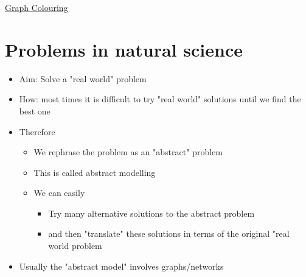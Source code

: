 \documentclass{article}[18pt]
\begin{document}
\begin{center}
\underline{\huge Graph Colouring}
\end{center}
\section{Problems in natural science}
\begin{itemize}
\item Aim: Solve a "real world" problem
\item How: most times it is difficult to try "real world" solutions until we find the best one
\item Therefore
\begin{itemize}
\item We rephrase the problem as an "abstract" problem
\item This is called abstract modelling
\item We can easily
\begin{itemize}
\item Try many alternative solutions to the abstract problem
\item and then "translate" these solutions in terms of the original "real world problem
\end{itemize}
\end{itemize}
\item Usually the "abstract model" involves graphs/networks
\end{itemize}
\end{document}
